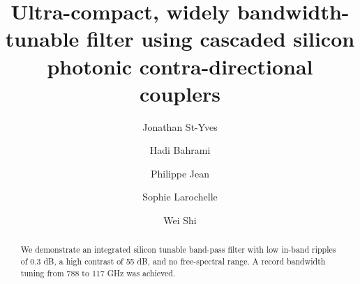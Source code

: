 \documentclass[osajnl,twocolumn,showpacs,superscriptaddress,10pt]{revtex4-1}
\begin{document}
\title{Ultra-compact, widely bandwidth-tunable filter using cascaded silicon photonic contra-directional couplers}

\author{Jonathan St-Yves} 
\author{Hadi Bahrami}
\author{Philippe Jean}
\author{Sophie Larochelle}
\author{Wei Shi}


\begin{abstract}
We demonstrate an integrated silicon tunable band-pass filter with low in-band ripples of 0.3 dB, a high contrast of 55 dB, and no free-spectral range. 
A record bandwidth tuning from 788 to 117 GHz was achieved.
\end{abstract}



\maketitle

\end{document}
